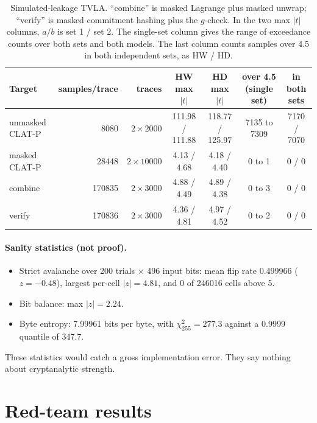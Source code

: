 \documentclass[10pt,a4paper]{article}
\newcommand{\abs}[1]{\left\lvert #1 \right\rvert}
\theoremstyle{definition}
\theoremstyle{remark}
\begin{document}
\begin{table}[t]
\centering\footnotesize\setlength{\tabcolsep}{4pt}
\begin{tabular}{@{}lrrcccc@{}}
\toprule
Target & samples/trace & traces & HW max $\abs{t}$ & HD max $\abs{t}$ & over 4.5 (single set) & in both sets\\
\midrule
unmasked CLAT-P & 8080 & $2\times2000$ & 111.98 / 111.88 & 118.77 / 125.97 & 7135 to 7309 & 7170 / 7070\\
masked CLAT-P & 28448 & $2\times10000$ & 4.13 / 4.68 & 4.18 / 4.40 & 0 to 1 & 0 / 0\\
combine & 170835 & $2\times3000$ & 4.88 / 4.49 & 4.89 / 4.38 & 0 to 3 & 0 / 0\\
verify & 170836 & $2\times3000$ & 4.36 / 4.81 & 4.97 / 4.52 & 0 to 2 & 0 / 0\\
\bottomrule
\end{tabular}
\caption{Simulated-leakage TVLA. ``combine'' is masked Lagrange plus masked unwrap; ``verify'' is masked commitment hashing plus the $g$-check. In the two max $\abs{t}$ columns, $a / b$ is set 1 / set 2. The single-set column gives the range of exceedance counts over both sets and both models. The last column counts samples over 4.5 in both independent sets, as HW / HD.}\label{tab:tvla}
\end{table}

\paragraph{Sanity statistics (not proof).}
\begin{itemize}
  \item Strict avalanche over 200 trials $\times$ 496 input bits: mean flip rate 0.499966 ($z=-0.48$), largest per-cell $\abs{z} = 4.81$, and 0 of 246016 cells above 5.
  \item Bit balance: max $\abs{z} = 2.24$.
  \item Byte entropy: 7.99961 bits per byte, with $\chi^2_{255} = 277.3$ against a 0.9999 quantile of 347.7.
\end{itemize}
These statistics would catch a gross implementation error. They say nothing about cryptanalytic strength.

\section{Red-team results}\label{sec:redteam}
\end{document}
